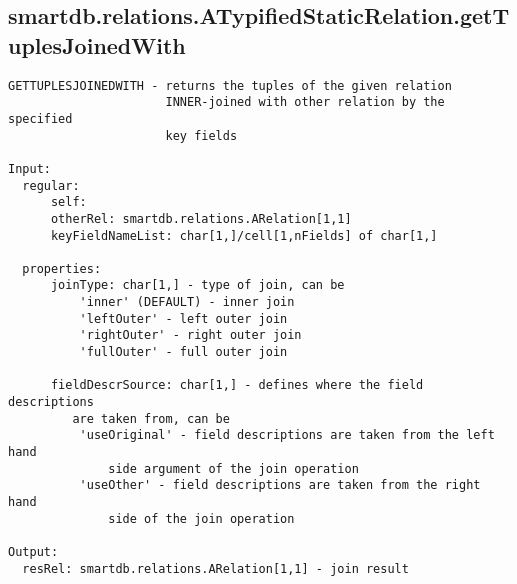 \subsection{\texorpdfstring{smartdb.relations.ATypifiedStaticRelation.getTuplesJoinedWith}{getTuplesJoinedWith}}\label{method:smartdb.relations.ATypifiedStaticRelation.getTuplesJoinedWith}
\begin{verbatim}
GETTUPLESJOINEDWITH - returns the tuples of the given relation
                      INNER-joined with other relation by the specified
                      key fields

Input:
  regular:
      self:
      otherRel: smartdb.relations.ARelation[1,1]
      keyFieldNameList: char[1,]/cell[1,nFields] of char[1,]

  properties:
      joinType: char[1,] - type of join, can be
          'inner' (DEFAULT) - inner join
          'leftOuter' - left outer join
          'rightOuter' - right outer join
          'fullOuter' - full outer join

      fieldDescrSource: char[1,] - defines where the field descriptions
         are taken from, can be
          'useOriginal' - field descriptions are taken from the left hand
              side argument of the join operation
          'useOther' - field descriptions are taken from the right hand
              side of the join operation

Output:
  resRel: smartdb.relations.ARelation[1,1] - join result
\end{verbatim}
